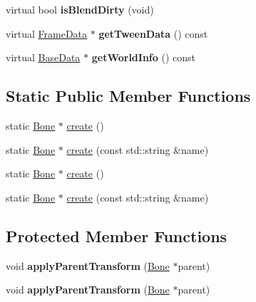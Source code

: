 \begin{DoxyCompactItemize}
\mbox{\label{classcocostudio_1_1Bone_a3115f15f64018a2175c289b28456cf82}} 
virtual bool {\bfseries is\+Blend\+Dirty} (void)
\item 
\mbox{\label{classcocostudio_1_1Bone_a09bd605c4def36f7ceeb42267c8b0a33}} 
virtual \hyperlink{classcocostudio_1_1FrameData}{Frame\+Data} $\ast$ {\bfseries get\+Tween\+Data} () const
\item 
\mbox{\label{classcocostudio_1_1Bone_a3d986782e73fdb95d9c80f8b454f86df}} 
virtual \hyperlink{classcocostudio_1_1BaseData}{Base\+Data} $\ast$ {\bfseries get\+World\+Info} () const
\end{DoxyCompactItemize}
\subsection*{Static Public Member Functions}
\begin{DoxyCompactItemize}
\item 
static \hyperlink{classcocostudio_1_1Bone}{Bone} $\ast$ \hyperlink{classcocostudio_1_1Bone_aba577a9c08804274ad1914331572959b}{create} ()
\item 
static \hyperlink{classcocostudio_1_1Bone}{Bone} $\ast$ \hyperlink{classcocostudio_1_1Bone_a45a1c12c432edb58c992d696e679ccd9}{create} (const std\+::string \&name)
\item 
static \hyperlink{classcocostudio_1_1Bone}{Bone} $\ast$ \hyperlink{classcocostudio_1_1Bone_ab20f5f5cb730a727333e3ea2dabcae3e}{create} ()
\item 
static \hyperlink{classcocostudio_1_1Bone}{Bone} $\ast$ \hyperlink{classcocostudio_1_1Bone_a1266563e2cf707ae62e3de45778e2681}{create} (const std\+::string \&name)
\end{DoxyCompactItemize}
\subsection*{Protected Member Functions}
\begin{DoxyCompactItemize}
\item 
\mbox{\label{classcocostudio_1_1Bone_a55bfd2b77763570f046b54d3d3b9a118}} 
void {\bfseries apply\+Parent\+Transform} (\hyperlink{classcocostudio_1_1Bone}{Bone} $\ast$parent)
\item 
\mbox{\label{classcocostudio_1_1Bone_a55bfd2b77763570f046b54d3d3b9a118}} 
void {\bfseries apply\+Parent\+Transform} (\hyperlink{classcocostudio_1_1Bone}{Bone} $\ast$parent)
\end{DoxyCompactItemize}
